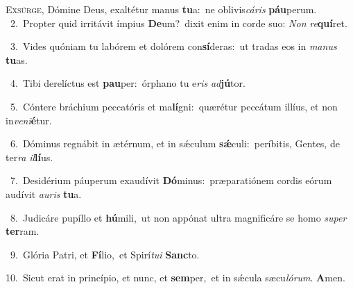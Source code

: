\lettrine{\initial\textcolor{\initialcolor}{E}}{xsúrge,} Dómine Deus, exaltétur manus \textbf{tu}\-a:~\star ne oblivis\-\textit{cá}\-\textit{ris} \textbf{páu}\-perum.\\
{\numbfont\textcolor{\numbcolor}{~2.}}~Propter quid irritávit ímpius \textbf{De}\-um?~\star dixit enim in corde suo: \textit{Non} \textit{re}\-\textbf{quí}ret.\par
{\numbfont\textcolor{\numbcolor}{~3.}}~Vides quóniam tu labórem et dolórem con\-\textbf{sí}\-deras:~\star ut tradas eos in \textit{ma}\-\textit{nus} \textbf{tu}\-as.\par
{\numbfont\textcolor{\numbcolor}{~4.}}~Tibi derelíctus est \textbf{pau}\-per:~\star órphano tu e\textit{ris} \textit{ad}\-\textbf{jú}tor.\par
{\numbfont\textcolor{\numbcolor}{~5.}}~Cóntere bráchium peccatóris et ma\-\textbf{lí}\-gni:~\star quærétur peccátum illíus, et non in\-\textit{ve}\-\textit{ni}\textbf{é}tur.\par
{\numbfont\textcolor{\numbcolor}{~6.}}~Dóminus regnábit in ætérnum, et in sǽculum \textbf{sǽ}\-culi:~\star períbitis, Gentes, de ter\textit{ra} \textit{il}\-\textbf{lí}us.\par
{\numbfont\textcolor{\numbcolor}{~7.}}~Desidérium páuperum exaudívit \textbf{Dó}\-minus:~\star præparatiónem cordis eórum audívit \textit{au}\-\textit{ris} \textbf{tu}\-a.\par
{\numbfont\textcolor{\numbcolor}{~8.}}~Judicáre pupíllo et \textbf{hú}\-mili,~\star ut non appónat ultra magnificáre se homo \textit{su}\-\textit{per} \textbf{ter}\-ram.\par
{\numbfont\textcolor{\numbcolor}{~9.}}~Glória Patri, et \textbf{Fí}\-lio,~\star et Spirí\-\textit{tu}\-\textit{i} \textbf{Sanc}\-to.\par
{\numbfont\textcolor{\numbcolor}{10.}}~Sicut erat in princípio, et nunc, et \textbf{sem}\-per,~\star et in sǽcula sæcu\-\textit{ló}\-\textit{rum}. \textbf{A}\-men.\par

